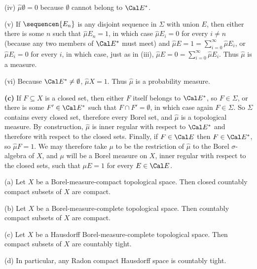 {\quad(iv) $\hat\mu\emptyset=0$ because $\emptyset$ cannot belong to $\Cal
E^*$.

\quad(v) If $\sequencen{E_n}$ is any disjoint sequence in $\Sigma$ with union
$E$, then either there is some $n$ such that $\hat\mu E_n=1$, in which
case $\hat\mu E_i=0$ for every $i\ne n$ (because any two members of
$\Cal E^*$ must meet) and $\hat\mu E=1=\sum_{i=0}^{\infty}\hat\mu E_i$,
or $\hat\mu E_i=0$ for every $i$, in which case, just as in (iii),
$\hat\mu E=0=\sum_{i=0}^{\infty}\hat\mu E_i$.   Thus $\hat\mu$ is a
measure.

\quad(vi) Because $\Cal E^*\ne\emptyset$, $\hat\mu X=1$.   Thus $\hat\mu$ is
a probability measure.\ \Qed

\medskip

{\bf (c)} If $F\subseteq X$ is a closed set, then either $F$ itself
belongs to $\Cal E^*$, so $F\in\Sigma$, or there is some $F'\in\Cal E^*$
such that $F\cap F'=\emptyset$, in which case again $F\in\Sigma$.   So
$\Sigma$ contains every closed set, therefore every Borel set, and
$\hat\mu$ is a topological measure.   By construction, $\hat\mu$ is
inner regular with respect to $\Cal E^*$ and therefore with respect to
the closed sets.   Finally, if $F\in\Cal E$ then $F\in\Cal E^*$, so
$\hat\mu F=1$.   We may therefore take $\mu$ to be the restriction of
$\hat\mu$ to
the Borel $\sigma$-algebra of $X$, and $\mu$ will be a Borel measure on
$X$,
inner regular with respect to the closed sets, such that $\mu E=1$ for
every $E\in\Cal E$.
}%

 (a) Let $X$ be a Borel-measure-compact
topological space.   Then closed countably compact subsets of $X$ are
compact.

(b) Let $X$ be a Borel-measure-complete topological space.
Then countably compact subsets of $X$ are compact.

(c) Let $X$ be a Hausdorff Borel-measure-complete topological space.
Then compact subsets of $X$ are countably tight.

(d) In particular, any Radon compact Hausdorff space is countably tight.

